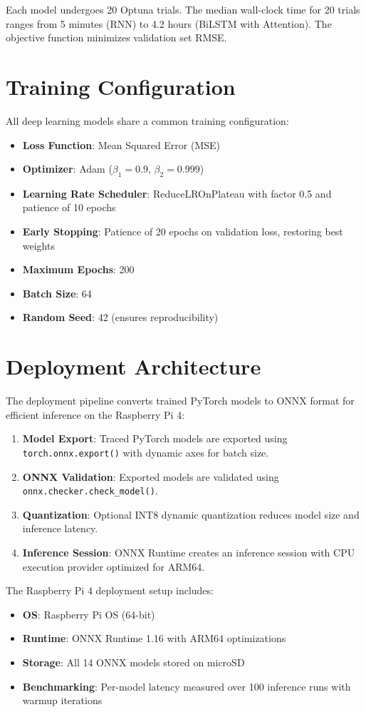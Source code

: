 Each model undergoes 20 Optuna trials. The median wall-clock time for 20 trials ranges from 5 minutes (RNN) to 4.2 hours (BiLSTM with Attention). The objective function minimizes validation set RMSE.

\section{Training Configuration}

All deep learning models share a common training configuration:

\begin{itemize}
    \item \textbf{Loss Function}: Mean Squared Error (MSE)
    \item \textbf{Optimizer}: Adam ($\beta_1 = 0.9$, $\beta_2 = 0.999$)
    \item \textbf{Learning Rate Scheduler}: ReduceLROnPlateau with factor 0.5 and patience of 10 epochs
    \item \textbf{Early Stopping}: Patience of 20 epochs on validation loss, restoring best weights
    \item \textbf{Maximum Epochs}: 200
    \item \textbf{Batch Size}: 64
    \item \textbf{Random Seed}: 42 (ensures reproducibility)
\end{itemize}

\section{Deployment Architecture}

The deployment pipeline converts trained PyTorch models to ONNX format for efficient inference on the Raspberry Pi 4:

\begin{enumerate}
    \item \textbf{Model Export}: Traced PyTorch models are exported using \texttt{torch.onnx.export()} with dynamic axes for batch size.
    \item \textbf{ONNX Validation}: Exported models are validated using \texttt{onnx.checker.check\_model()}.
    \item \textbf{Quantization}: Optional INT8 dynamic quantization reduces model size and inference latency.
    \item \textbf{Inference Session}: ONNX Runtime creates an inference session with CPU execution provider optimized for ARM64.
\end{enumerate}

The Raspberry Pi 4 deployment setup includes:
\begin{itemize}
    \item \textbf{OS}: Raspberry Pi OS (64-bit)
    \item \textbf{Runtime}: ONNX Runtime 1.16 with ARM64 optimizations
    \item \textbf{Storage}: All 14 ONNX models stored on microSD
    \item \textbf{Benchmarking}: Per-model latency measured over 100 inference runs with warmup iterations
\end{itemize}
